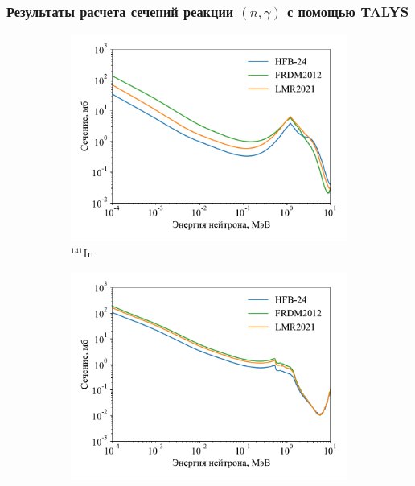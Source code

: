 \subsubsection{Результаты расчета сечений реакции $(n,\gamma)$ с помощью TALYS}

\begin{figure}
  \centering
  \begin{subfigure}{0.48\textwidth}
    \centering
    \includegraphics[width=\textwidth]{../pics/cs_in141.pdf}
    \caption{${}^{141}$In}
  \end{subfigure}
  \hfill
  \begin{subfigure}{0.48\textwidth}
    \centering
    \includegraphics[width=\textwidth]{../pics/cs_in142.pdf}

\end{subfigure}
\end{figure}
